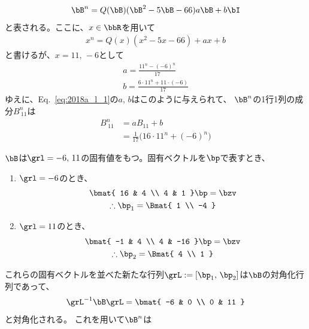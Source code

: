 \begin{ans*}
\begin{enumerate}[label=(\arabic*), ref=(\arabic*), itemsep=0pt]
\begin{gather}
      \bB^{n} = Q(\bB)(\bB^2 - 5\bB - 66) a\bB + b\bI \label{eq:2018a_l_1}
    \end{gather}
    と表される。ここに、$x\in\bbR$を用いて
    \begin{gather}
      x^{n} = Q(x)(x^2 - 5x - 66) + ax + b
    \end{gather}
    と書けるが、$x = 11,\,-6$として
    \begin{gather}
      a = \frac{11^{n} - (-6)^{n}}{17} \\
      b = \frac{6\cdot 11^{n} + 11\cdot(-6)}{17}
    \end{gather}
    ゆえに、Eq.~\eqref{eq:2018a_l_1}の$a,\,b$はこのように与えられて、
    $\bB^n$の1行1列の成分$B^{n}_{\:11}$は
    \begin{align}
      B^{n}_{\:11}
      &= aB_{11} + b \\
      &= \frac{1}{17} \bigl(16\cdot 11^{n} + (-6)^{n}\bigr)
    \end{align}
    \begin{other*}
      $\bB$は$\grl = -6,\,11$の固有値をもつ。固有ベクトルを$\bp$で表すとき、
      \begin{enumerate}[label=(\roman*), ref=(\roman*), itemsep=0pt]
        \item $\grl = -6$のとき、
        \begin{gather}
          \bmat{
            16 & 4 \\
            4 & 1
          }\bp = \bzv \\
          \therefore \bp_1 = \Bmat{
            1 \\ -4
          }
        \end{gather}
        \item $\grl = 11$のとき、
        \begin{gather}
          \bmat{
            -1 & 4 \\
            4 & -16
          }\bp = \bzv \\
          \therefore \bp_2 = \Bmat{
            4 \\ 1
          }
        \end{gather}
      \end{enumerate}
      これらの固有ベクトルを並べた新たな行列$\grL:=[\bp_1,\,\bp_2]$は$\bB$の対角化行列であって、
      \begin{gather}
        \grL^{-1}\bB\grL
        = \bmat{
          -6 & 0 \\ 0 & 11
        }
      \end{gather}
      と対角化される。
      これを用いて$\bB^{n}$は

\end{other*}
\end{enumerate}
\end{ans*}
